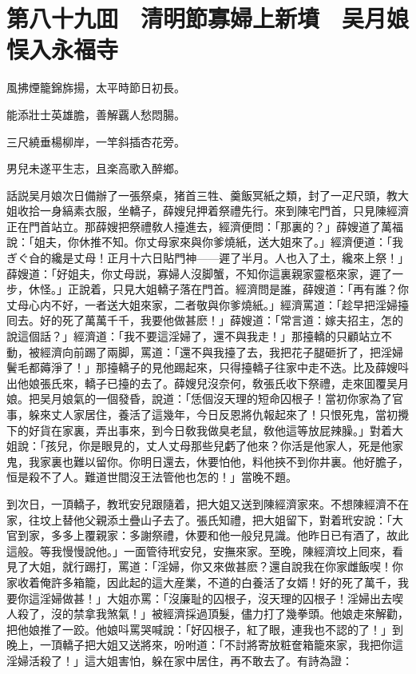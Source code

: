 \chapter*{第八十九囬　清明節寡婦上新墳　吴月娘悮入永福寺}

風拂煙籠錦旆揚，太平時節日初長。

能添壯士英雄膽，善解覊人愁悶腸。

三尺繞垂楊柳岸，一竿斜插杏花旁。

男兒未遂平生志，且楽高歌入醉鄉。

話説吴月娘次日備辦了一張祭桌，猪首三牲、羹飯冥紙之類，封了一疋尺頭，教大姐收拾一身縞素衣服，坐轎子，薛嫂兒押着祭禮先行。來到陳宅門首，只見陳經濟正在門首站立。那薛嫂把祭禮敎人擡進去，經濟便問：「那裏的？」薛嫂道了萬福說：「姐夫，你休推不知。你丈母家來與你爹燒紙，送大姐來了。」經濟便道：「我ぎぐ㒲的纔是丈母！正月十六日貼門神——遲了半月。人也入了土，纔來上祭！」薛嫂道：「好姐夫，你丈母説，寡婦人沒脚蟹，不知你這裏親家靈柩來家，遲了一步，休怪。」正說着，只見大姐轎子落在門首。經濟問是誰，薛嫂道：「再有誰？你丈母心内不好，一者送大姐來家，二者敬與你爹燒紙。」經濟罵道：「趁早把淫婦擡囘去。好的死了萬萬千千，我要他做甚麽！」薛嫂道：「常言道：嫁夫招主，怎的說這個話？」經濟道：「我不要這淫婦了，還不與我走！」那擡轎的只顧站立不動，被經濟向前踢了兩脚，罵道：「還不與我擡了去，我把花子腿砸折了，把淫婦鬢毛都薅淨了！」那擡轎子的見他踢起來，只得擡轎子往家中走不迭。比及薛嫂呌出他娘張氏來，轎子已擡的去了。薛嫂兒沒奈何，敎張氏收下祭禮，走來囬覆吴月娘。把吴月娘氣的一個發昏，說道：「恁個沒天理的短命囚根子！當初你家為了官事，躲來丈人家居住，養活了這幾年，今日反恩將仇報起來了！只恨死鬼，當初攪下的好貨在家裏，弄出事來，到今日敎我做臭老鼠，敎他這等放屁辣臊。」對着大姐說：「孩兒，你是眼見的，丈人丈母那些兒虧了他來？你活是他家人，死是他家鬼，我家裏也難以留你。你明日還去，休要怕他，料他挾不到你井裏。他好膽子，恒是殺不了人。難道世間沒王法管他也怎的！」當晚不題。

到次日，一頂轎子，教玳安兒跟隨着，把大姐又送到陳經濟家來。不想陳經濟不在家，往坟上替他父親添土疊山子去了。張氏知禮，把大姐留下，對着玳安說：「大官到家，多多上覆親家：多謝祭禮，休要和他一般兒見識。他昨日已有酒了，故此這般。等我慢慢說他。」一面管待玳安兒，安撫來家。至晚，陳經濟坟上囘來，看見了大姐，就行踢打，罵道：「淫婦，你又來做甚麽？還自說我在你家雌飯喫！你家收着俺許多箱籠，因此起的這大産業，不道的白養活了女婿！好的死了萬千，我要你這淫婦做甚！」大姐亦罵：「沒廉耻的囚根子，沒天理的囚根子！淫婦出去喫人殺了，沒的禁拿我煞氣！」被經濟採過頂髮，儘力打了幾拳頭。他娘走來解勸，把他娘推了一跤。他娘呌罵哭喊說：「好囚根子，紅了眼，連我也不認的了！」到晚上，一頂轎子把大姐又送將來，吩咐道：「不討將寄放粧奩箱籠來家，我把你這淫婦活殺了！」這大姐害怕，躲在家中居住，再不敢去了。有詩為證：

